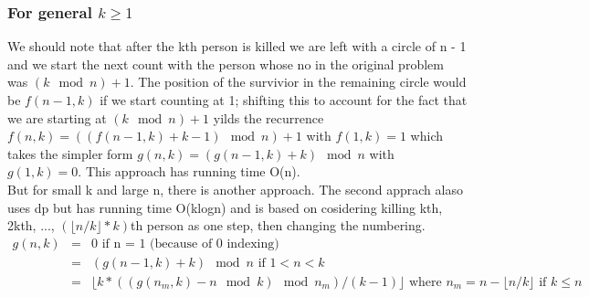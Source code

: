\documentclass[8pt, a4paper, oneside, twocolumn]{extarticle}
\begin{document}
\subsubsection{For general $k \geq 1$}
We should note that after the kth person is killed we are left with a circle of n - 1 and we start the next count with the person whose no in the original problem was $(k \mod n) + 1$. The position of the survivior in the remaining circle would be $f(n - 1, k)$ if we start counting at 1; shifting this to account for the fact that we are starting at $(k \mod n) + 1$ yilds the recurrence $f(n, k) =  ((f(n - 1, k) + k - 1) \mod n) + 1$ with $f(1, k) = 1$ which takes the simpler form $g(n, k) = (g(n - 1, k) + k) \mod n$ with $g(1, k) = 0$. This approach has running time O(n).
\\But for small k and large n, there is another approach. The second apprach alaso uses dp but has running time O(klogn) and is based on cosidering killing kth, 2kth, ..., $(\lfloor n/k \rfloor * k)$th person as one step, then changing the numbering.
\begin{eqnarray}
g(n, k) &=& 0 \text{ if n = 1 (because of 0 indexing)}\\
        &=& (g(n - 1, k) + k) \mod n \text{ if $1 < n < k$}\\
        &=& \lfloor k * ((g(n_m, k) - n \mod k) \mod n_m) / (k - 1) \rfloor \text{ where $n_m = n - \lfloor n/k \rfloor$ if $k \leq n$}
\end{eqnarray}
\end{document}
